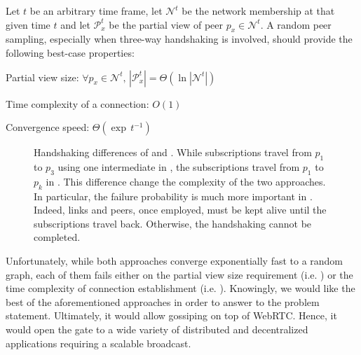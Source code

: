 \begin{problem}
  Let $t$ be an arbitrary time frame, let $\mathcal{N}^t$ be the network
  membership at that given time $t$ and let $\mathcal{P}_x^t$ be the partial view of peer $p_x \in \mathcal{N}^t$. 
  A random peer sampling, especially when three-way handshaking is involved, should provide the following best-case properties:
  \begin{center}
    Partial view size: \hfill
    $\forall p_x \in \mathcal{N}^t,\, |\mathcal{P}_x^t| = \Theta (\ln
    |\mathcal{N}^t|)$
  \end{center}
  \begin{center}
    Time complexity of a connection: \hfill $O(1)$
  \end{center}
  \begin{center}
    Convergence speed: \hfill $\Theta(\exp \, t^{-1})$
  \end{center}
\end{problem}

\begin{figure}
  \centering
  
  \caption{\label{fig:handshakeexample}Handshaking differences of \CYCLON{} and
    \SCAMP{}. While subscriptions travel from $p_1$ to $p_3$ using one
    intermediate in \CYCLON{}, the subscriptions travel from $p_1$ to $p_k$ in
    \SCAMP{}. This difference change the complexity of the two approaches. In
    particular, the failure probability is much more important in
    \SCAMP{}. Indeed, links and peers, once employed, must be kept alive until
    the subscriptions travel back. Otherwise, the handshaking cannot be
    completed.}
\end{figure}

Unfortunately, while both approaches converge exponentially fast to a random
graph, each of them fails either on the partial view size requirement
(i.e. \CYCLON{}) or the time complexity of connection establishment
(i.e. \SCAMPLON{}). Knowingly, we would like the best of the aforementioned
approaches in order to answer to the problem statement. Ultimately, it would
allow gossiping on top of WebRTC. Hence, it would open the gate to a wide
variety of distributed and decentralized applications requiring a scalable
broadcast.

